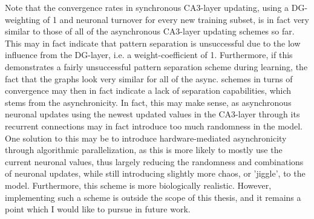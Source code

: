 


Note that the convergence rates in synchronous CA3-layer updating, using a DG-weighting of 1 and neuronal turnover for every new training subset, is in fact very similar to those of all of the asynchronous CA3-layer updating schemes so far. This may in fact indicate that pattern separation is unsuccessful due to the low influence from the DG-layer, i.e. a weight-coefficient of 1. Furthermore, if this demonstrates a fairly unsuccessful pattern separation scheme during learning, the fact that the graphs look very similar for all of the async. schemes in turns of convergence may then in fact indicate a lack of separation capabilities, which stems from the asynchronicity. In fact, this may make sense, as asynchronous neuronal updates using the newest updated values in the CA3-layer through its recurrent connections may in fact introduce too much randomness in the model. One solution to this may be to introduce hardware-mediated asynchronicity through algorithmic parallelization, as this is more likely to mostly use the current neuronal values, thus largely reducing the randomness and combinations of neuronal updates, while still introducing slightly more chaos, or 'jiggle', to the model. Furthermore, this scheme is more biologically realistic. However, implementing such a scheme is outside the scope of this thesis, and it remains a point which I would like to pursue in future work.

